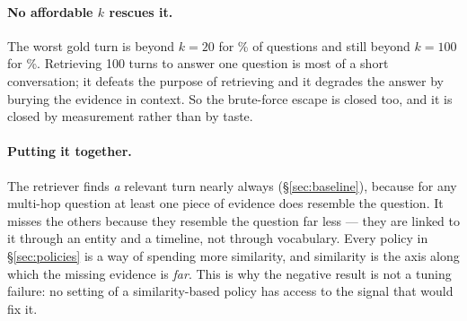 \paragraph{No affordable $k$ rescues it.}
The worst gold turn is beyond $k{=}20$ for \rBeyondTwenty{}\% of questions and
still beyond $k{=}100$ for \rBeyondHundred{}\%. Retrieving 100 turns to answer
one question is most of a short conversation; it defeats the purpose of
retrieving and it degrades the answer by burying the evidence in context. So the
brute-force escape is closed too, and it is closed by measurement rather than by
taste.

\paragraph{Putting it together.}
The retriever finds \emph{a} relevant turn nearly always (\S\ref{sec:baseline}),
because for any multi-hop question at least one piece of evidence does resemble
the question. It misses the others because they resemble the question far less
--- they are linked to it through an entity and a timeline, not through
vocabulary. Every policy in \S\ref{sec:policies} is a way of spending more
similarity, and similarity is the axis along which the missing evidence is
\emph{far}. This is why the negative result is not a tuning failure: no setting
of a similarity-based policy has access to the signal that would fix it.
